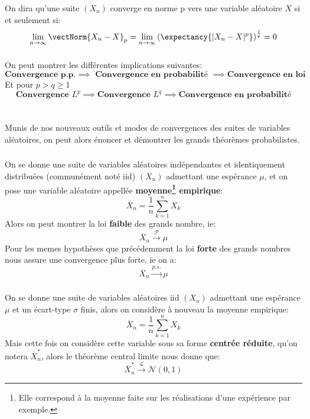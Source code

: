 \subsection*{}
On dira qu'une suite \( (X_n) \) converge en norme p vers une variable aléatoire \( X \) si et seulement si:
\[ 
   \lim_{n \rightarrow \infty} \vectNorm{X_n - X}_p = \lim_{n \rightarrow \infty} \left(\expectancy{|X_n - X|^p}\right)^{ \frac{1}{p}} =  0 
\]
\subsection*{}
On peut montrer les différentes implications suivantes:
\[ 
   \textbf{Convergence p.p.} \implies \textbf{ Convergence en probabilité } \implies \textbf{Convergence en loi}
\]
Et pour \( p > q \geq 1 \)
\[ 
   \textbf{Convergence }L^p \implies \textbf{Convergence } L^q \implies \textbf{Convergence en probabilité}
\]
\chapter*{} %

Munis de nos nouveaux outils et modes de convergences des suites de variables aléatoires, on peut alors énoncer et démontrer les grands théorèmes probabilistes.
\subsection*{}
On se donne une suite de variables aléatoires indépendantes et identiquement distribuées (communément noté iid) \((X_n)\) admettant une espérance \(\mu\), et on pose une variable aléatoire appellée \textbf{moyenne\footnote[1]{Elle correspond à la moyenne faite sur les réalisations d'une expérience par exemple.} empirique}:
\[
   \overline{X}_n = \frac{1}{n}\sum_{k=1}^{n}X_k   
\]
Alors on peut montrer la loi \textbf{faible} des grands nombre, ie:
\[
   \overline{X}_n \overset{\mathcal{P}}{\longrightarrow} \mu
\]
Pour les memes hypothèses que précédemment la loi \textbf{forte} des grands nombres nous assure une convergence plus forte, ie on a:
\[
   \overline{X}_n \overset{p.s.}{\longrightarrow} \mu
\]
\subsection*{}
On se donne une suite de variables aléatoires iid \((X_n)\) admettant une espérance \(\mu\) et un écart-type \(\sigma\) finis, alors on considère à nouveau la moyenne empirique:
\[
   \overline{X}_n = \frac{1}{n}\sum_{k=1}^{n}X_k   
\]
Mais cette fois on considère cette variable sous sa forme \textbf{centrée réduite}, qu'on notera \(\overline{X}_n^*\), alors le théorème central limite nous donne que:
\[
   \overline{X}_n^* \overset{\mathcal{L}}{\longrightarrow} \mathcal{N}(0, 1)
\]